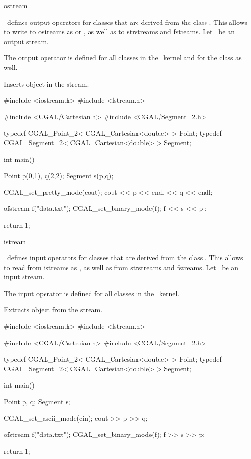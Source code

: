 \begin{ccClass} {ostream}

\ccDefinition
\cgal\  defines output operators for classes that are derived
from the class . This allows to write to ostreams
as  or , as well as to strstreams
and fstreams. Let \ccVar\  be an output stream.

\ccOperations
The output operator is defined for all classes in the \cgal\ kernel and for the class  as well.

{Inserts object  in the stream. }


\ccExample

\begin{cprog}

#include <iostream.h>
#include <fstream.h>

#include <CGAL/Cartesian.h>
#include <CGAL/Segment_2.h>

typedef CGAL_Point_2< CGAL_Cartesian<double> >     Point;
typedef CGAL_Segment_2< CGAL_Cartesian<double> >   Segment;

int main()
{
    Point p(0,1), q(2,2);
    Segment s(p,q);

    CGAL_set_pretty_mode(cout);
    cout << p << endl << q  << endl;

    ofstream f("data.txt");
    CGAL_set_binary_mode(f);
    f << s << p ;

    return 1;
}
\end{cprog} 
\end{ccClass} 


\newpage
\begin{ccClass} {istream}

\ccDefinition
\cgal\  defines input operators for classes that are derived
from the class . This allows to read from istreams
as , as well as from strstreams and fstreams.
Let \ccVar\ be an input stream.

\ccOperations

The input operator is defined for all classes in the \cgal\ kernel.

{Extracts object  from the stream.}


\ccExample

\begin{cprog}

#include <iostream.h>
#include <fstream.h>

#include <CGAL/Cartesian.h>
#include <CGAL/Segment_2.h>

typedef CGAL_Point_2< CGAL_Cartesian<double> >     Point;
typedef CGAL_Segment_2< CGAL_Cartesian<double> >   Segment;

int
main()
{
    Point p, q;
    Segment s;

    CGAL_set_ascii_mode(cin);
    cout >> p >> q;

    ofstream f("data.txt");
    CGAL_set_binary_mode(f);
    f >> s >> p;

    return 1;
}
\end{cprog} 
\end{ccClass} 
